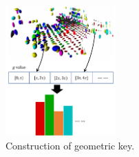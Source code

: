 \documentclass[letterpaper, 10 pt, conference]{ieeeconf}   %
\newcommand\kevin[1]{\textcolor{black}{#1}}
\begin{document}
\begin{figure}[t] %
\centering %
\includegraphics[height=5cm]{geometrickey.pdf} %
\caption{Construction of geometric key.} 
\label{GK} %
 \vspace{-0.2in}
\end{figure}
\end{document}
